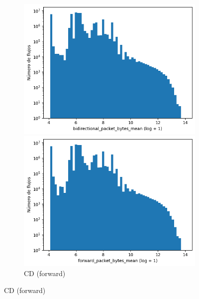 \begin{figure}[H]
    \centering
    \hfill
    \begin{subfigure}[b]{0.26\textwidth}
        \centering
        \includegraphics[width=\textwidth]{media/packet_pincer_cicddos/bidirectional_packet_bytes_mean_log_x_log_y.png}
        \caption{CD (bidir.)}
        \includegraphics[width=\textwidth]{media/packet_pincer_cicddos/forward_packet_bytes_mean_log_x_log_y.png}
        \caption{CD (forward)}

\end{subfigure}
\end{figure}

